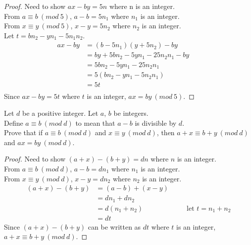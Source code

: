 \begin{proof} 
Need to show $ax - by = 5n$ where n is an integer. \\
From $a \equiv b\ (mod\ 5)$, $a - b = 5n_1$ where $n_1$ is an integer. \\
From $x \equiv y\ (mod\ 5)$, $x - y = 5n_2$ where $n_2$ is an integer. \\
Let $t = bn_2 - yn_1 -5n_1n_2$.
\begin{align*}
ax - by &= (b - 5n_1)(y + 5n_2) - by && \\
&= by + 5bn_2 - 5yn_1 -25n_2n_1 - by && \\
&= 5bn_2 - 5yn_1 -25n_2n_1 && \\
&= 5(bn_2 - yn_1 -5n_2n_1) && \\
&= 5t && \\
\end{align*}
Since $ax - by = 5t$ where $t$ is an integer, $ax = by\ (mod\ 5)$.
\end{proof}


\begin{tcolorbox}[title=Problem 25, breakable]
Let $d$ be a positive integer. Let $a$, $b$ be integers. \\
Define $a \equiv b\ (mod\ d)$ to mean that $a - b$ is divisible by $d$. \\
Prove that if $a \equiv b\ (mod\ d)$ and $x \equiv y\ (mod\ d)$, then 
$a + x \equiv b + y\ (mod\ d)$ and $ax = by\ (mod\ d)$.
\end{tcolorbox}

\begin{proof}
Need to show $(a + x) - (b + y) = dn$ where $n$ is an integer. \\
From $a \equiv b\ (mod\ d)$, $a - b = dn_1$ where $n_1$ is an integer. \\
From $x \equiv y\ (mod\ d)$, $x - y = dn_2$ where $n_2$ is an integer.
\begin{align*}
(a + x) - (b + y) &= (a - b) + (x - y) && \\
&= dn_1 + dn_2 && \\
&= d(n_1 + n_2) && \quad \text{let $t = n_1 + n_2$} \\
&= dt &&
\end{align*}
Since $(a + x) - (b + y)$ can be written as $dt$ where $t$ is an integer, $a + x \equiv b + y\ (mod\ d)$. 
\end{proof}

